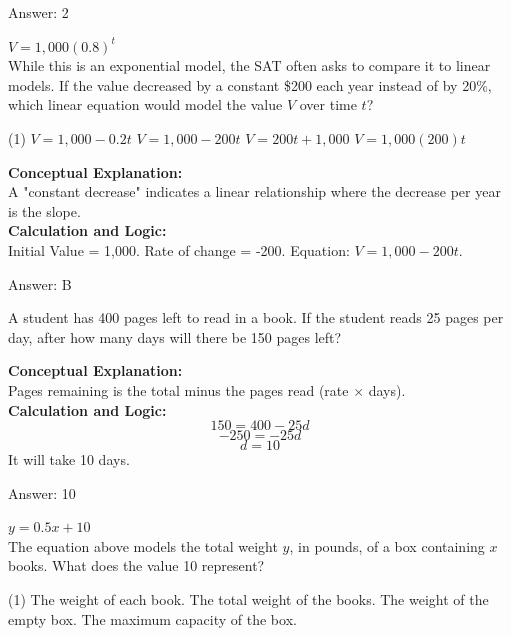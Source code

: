 \documentclass[11pt,paper=a4,answers]{exam}
\begin{document}
\begin{questions}
\begin{solution}
\vspace{15pt}
Answer: \colorbox{yellow!100}{2}
\end{solution}

\question
$V = 1,000(0.8)^t$ \\
While this is an exponential model, the SAT often asks to compare it to linear models. If the value decreased by a constant \$200 each year instead of by 20\%, which linear equation would model the value $V$ over time $t$?
\begin{tasks}(1)
    \task $V = 1,000 - 0.2t$
    \task $V = 1,000 - 200t$
    \task $V = 200t + 1,000$
    \task $V = 1,000(200)t$
\end{tasks}

\begin{solution}
\textbf{Conceptual Explanation:} \\
A "constant decrease" indicates a linear relationship where the decrease per year is the slope.
\\[10pt]
\textbf{Calculation and Logic:} \\
Initial Value = 1,000. 
Rate of change = -200. 
Equation: $V = 1,000 - 200t$.

\vspace{15pt}
Answer: \colorbox{yellow!100}{B}
\end{solution}

\question
A student has 400 pages left to read in a book. If the student reads 25 pages per day, after how many days will there be 150 pages left?

\begin{solution}
\textbf{Conceptual Explanation:} \\
Pages remaining is the total minus the pages read (rate $\times$ days).
\\[10pt]
\textbf{Calculation and Logic:} \\
\[150 = 400 - 25d\]
\[-250 = -25d\]
\[d = 10\]
It will take 10 days.

\vspace{15pt}
Answer: \colorbox{yellow!100}{10}
\end{solution}

\question
$y = 0.5x + 10$ \\
The equation above models the total weight $y$, in pounds, of a box containing $x$ books. What does the value 10 represent?
\begin{tasks}(1)
    \task The weight of each book.
    \task The total weight of the books.
    \task The weight of the empty box.
    \task The maximum capacity of the box.
\end{tasks}


\end{questions}
\end{document}
